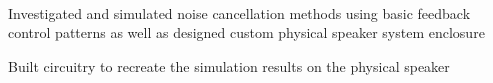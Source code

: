 \documentclass[letterpaper, article]{deedy-resume-openfont}
\begin{document}
\begin{minipage}[t]{0.66\textwidth}
\\
\begin{tightemize}
	\item Investigated and simulated noise cancellation methods using basic feedback control patterns as well as designed custom physical speaker system enclosure
	\item Built circuitry to recreate the simulation results on the physical speaker
\end{tightemize}




%
%


\end{minipage}
\end{document}
